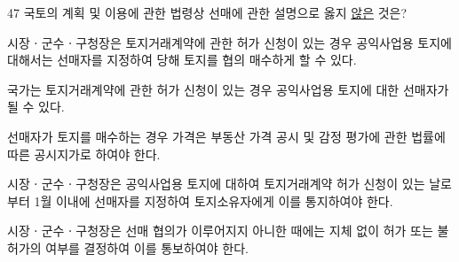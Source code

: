\begin{question}{47}
국토의 계획 및 이용에 관한 법령상 선매에 관한 설명으로 옳지 \uline{않은} 것은?
\begin{choices}
  \item 시장ㆍ군수ㆍ구청장은 토지거래계약에 관한 허가 신청이 있는 경우 공익사업용 토지에 대해서는 선매자를 지정하여 당해 토지를 협의 매수하게 할 수 있다.
  \item 국가는 토지거래계약에 관한 허가 신청이 있는 경우 공익사업용 토지에 대한 선매자가 될 수 있다.
  \item 선매자가 토지를 매수하는 경우 가격은 부동산 가격 공시 및 감정 평가에 관한 법률에 따른 공시지가로 하여야 한다.
  \item 시장ㆍ군수ㆍ구청장은 공익사업용 토지에 대하여 토지거래계약 허가 신청이 있는 날로부터 1월 이내에 선매자를 지정하여 토지소유자에게 이를 통지하여야 한다.
  \item 시장ㆍ군수ㆍ구청장은 선매 협의가 이루어지지 아니한 때에는 지체 없이 허가 또는 불허가의 여부를 결정하여 이를 통보하여야 한다.
\end{choices}
\end{question}
